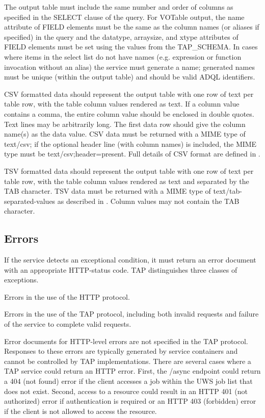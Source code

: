 \documentclass[11pt,letter]{ivoa}
\newcommand{\tapschema}{TAP\_SCHEMA}
\newcommand{\tapschema}{{%
  \relsize{-0.5}TAP\discretionary{-}{}{\kern-2pt\_}SCHEMA}}
\begin{document}
The output table must include the same number and order of columns as specified 
in the SELECT clause of the query. For VOTable output, the name attribute of 
FIELD elements must be the same as the column names (or aliases if specified)  
in the query and the datatype, arraysize, and xtype 
attributes of FIELD elements must be set using the values from the \tapschema. 
In cases where items in the select list do not 
have names (e.g. expression or function invocation without an alias) the service 
must generate a name; 
generated names must be unique (within the output table) and should be valid 
ADQL identifiers.

CSV formatted data should represent the output table with one row of text per 
table row, with the table column values rendered as text. 
If a column value contains a comma, the entire column value should be 
enclosed in double quotes.  Text lines may be arbitrarily long.  The first data 
row should give the column name(s) as the data value.   CSV data must be returned 
with a MIME type of text/csv; if the optional header line (with column names) 
is included, the MIME type must be text/csv;header=present. Full details of CSV 
format are defined in \citet{std:CSV}.

TSV formatted data should represent the output table with one row of text per 
table row, with the table column values rendered as text and separated by the 
TAB character. TSV data must be returned with a MIME type of 
text/tab-separated-values as described in
\citet{std:TSV}. Column values may not contain the 
TAB 
character.

\subsection{Errors}
\label{sec:query-error}

If the service detects an exceptional condition, it must return an error 
document with an appropriate HTTP-status code. TAP distinguishes three classes 
of exceptions.

Errors in the use of the HTTP protocol. 

Errors in the use of the TAP protocol, including both invalid requests and 
failure of the service to complete valid requests. 

Error documents for HTTP-level errors are not specified in the TAP protocol. 
Responses to these errors are typically generated by service containers and 
cannot be controlled by TAP implementations. There are several cases where a 
TAP 
service could return an HTTP error. First, the /async endpoint could return a 
404 (not found) error if the client accesses a job within the UWS job list that 
does not exist. Second, access to a resource could result in an HTTP 401 (not 
authorized) error if authentication is required or an HTTP 403 (forbidden) 
error if the client is not allowed to access the resource.
\end{document}
